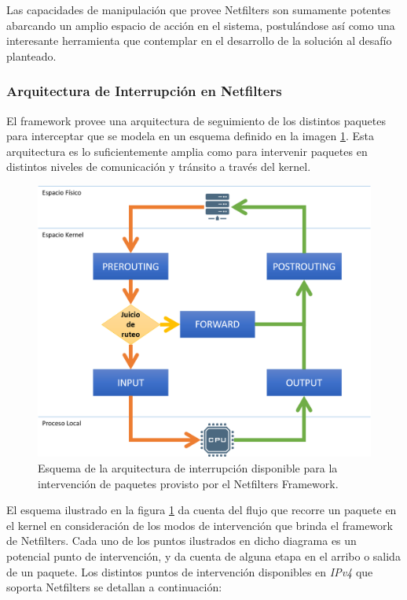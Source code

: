 Las capacidades de manipulación que provee Netfilters son sumamente potentes abarcando un amplio espacio de acción en el sistema, postulándose así como una interesante herramienta que contemplar en el desarrollo de la solución al desafío planteado.

\subsubsection{Arquitectura de Interrupción en Netfilters}
El framework provee una arquitectura de seguimiento de los distintos paquetes para interceptar que se modela en un esquema definido en la imagen \ref{fig:netfilterArchitecture}. Esta arquitectura es lo suficientemente amplia como para intervenir paquetes en distintos niveles de comunicación y tránsito a través del kernel.

\begin{figure}[!h]
	\centering
	\includegraphics[scale=.65]{imagenes/netfilterArchitecture}
	\caption{Esquema de la arquitectura de interrupción disponible para la intervención de paquetes provisto por el Netfilters Framework.}
	\label{fig:netfilterArchitecture}
\end{figure}

El esquema ilustrado en la figura \ref{fig:netfilterArchitecture} da cuenta del flujo que recorre un paquete en el kernel en consideración de los modos de intervención que brinda el framework de Netfilters. Cada uno de los puntos ilustrados en dicho diagrama es un potencial punto de intervención, y da cuenta de alguna etapa en el arribo o salida de un paquete. Los distintos puntos de intervención disponibles en \emph{IPv4} que soporta Netfilters se detallan a continuación:

